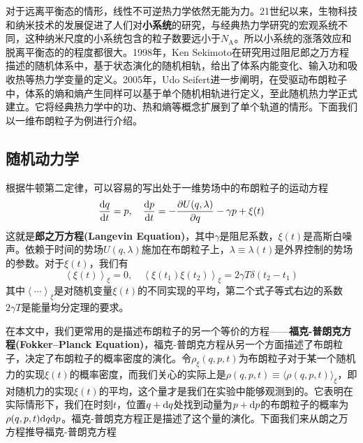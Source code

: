 对于远离平衡态的情形，线性不可逆热力学依然无能为力。21世纪以来，生物科技和纳米技术的发展促进了人们对\textbf{小系统}的研究，与经典热力学研究的宏观系统不同，这种纳米尺度的小系统包含的粒子数要远小于$N_{\mathrm{A}}$。所以小系统的涨落效应和脱离平衡态的的程度都很大。1998年，Ken Sekimoto在研究用过阻尼郎之万方程描述的随机体系中，基于状态演化的随机相轨，给出了体系内能变化、输入功和吸收热等热力学变量的定义\cite{Sekimoto1998}。2005年，Udo Seifert进一步阐明，在受驱动布朗粒子中，体系的熵和熵产生同样可以基于单个随机相轨进行定义\cite{Seifert2005}，至此随机热力学正式建立。它将经典热力学中的功、热和熵等概念扩展到了单个轨道的情形。下面我们以一维布朗粒子为例进行介绍。

\subsection{随机动力学}
\label{c1s3}
\qquad 根据牛顿第二定律，可以容易的写出处于一维势场中的布朗粒子的运动方程
\begin{equation}
    \frac{\mathrm{d} q}{\mathrm{d} t}=p, \quad \frac{\mathrm{d} p}{\mathrm{d} t}=-\frac{\partial U(q,\lambda)}{\partial q}-\gamma p+\xi(t)
    \label{eq1.1}
\end{equation}
这就是\textbf{郎之万方程(Langevin Equation)}，其中$\gamma$是阻尼系数，$\xi(t)$是高斯白噪声。依赖于时间的势场$U(q,\lambda)$施加在布朗粒子上，$\lambda\equiv\lambda(t)$是外界控制的势场的参数。对于$\xi(t)$，我们有
\begin{equation}
    \left\langle\xi\left(t\right)\right\rangle_{\xi}=0,\quad \left\langle\xi\left(t_{1}\right) \xi\left(t_{2}\right)\right\rangle_{\xi}=2 \gamma T  \delta\left(t_{2}-t_{1}\right)
    \label{eq1.2}
\end{equation}
其中$\left\langle \cdots \right\rangle_{\xi}$是对随机变量$\xi(t)$的不同实现的平均，第二个式子等式右边的系数$2 \gamma T$是能量均分定理的要求。\cite{Reichl2016}

在本文中，我们更常用的是描述布朗粒子的另一个等价的方程——\textbf{福克-普朗克方程(Fokker–Planck Equation)}\cite{Reichl2016}，福克-普朗克方程从另一个方面描述了布朗粒子，决定了布朗粒子的概率密度的演化。令$\rho_{\xi}(q,p,t)$为布朗粒子对于某一个随机力的实现$\xi(t)$的概率密度，而我们关心的实际上是$\rho(q,p,t)\equiv\langle \rho(q,p,t) \rangle_{\xi}$，即对随机力的实现$\xi(t)$的平均，这个量才是我们在实验中能够观测到的。它表明在实际情形下，我们在时刻$t$，位置$q+\mathrm{d} q$处找到动量为$p+\mathrm{d} p$的布朗粒子的概率为$\rho(q,p,t) \mathrm{d} q \mathrm{d} p$。福克-普朗克方程正是描述了这个量的演化。下面我们来从朗之万方程推导福克-普朗克方程

